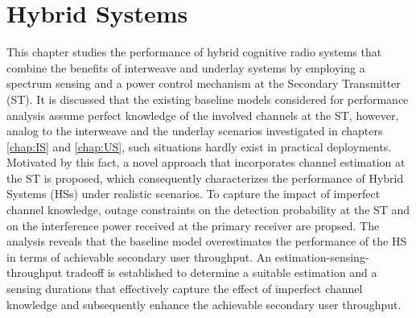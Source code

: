 \chapter{Hybrid Systems} \label{chap:HS}

This chapter studies the performance of hybrid cognitive radio systems that combine the benefits of interweave and underlay systems by employing a spectrum sensing and a power control mechanism at the Secondary Transmitter (ST). It is discussed that the existing baseline models considered for performance analysis assume perfect knowledge of the involved channels at the ST, however, analog to the interweave and the underlay scenarios investigated in chapters \ref{chap:IS} and \ref{chap:US}, such situations hardly exist in practical deployments. Motivated by this fact, a novel approach that incorporates channel estimation at the ST is proposed, which consequently characterizes the performance of Hybrid Systems (HSs) under realistic scenarios. To capture the impact of imperfect channel knowledge, outage constraints on the detection probability at the ST and on the interference power received at the primary receiver are propsed. The analysis reveals that the baseline model overestimates the performance of the HS in terms of achievable secondary user throughput. An estimation-sensing-throughput tradeoff is established to determine a suitable estimation and a sensing durations that effectively capture the effect of imperfect channel knowledge and subsequently enhance the achievable secondary user throughput. 

